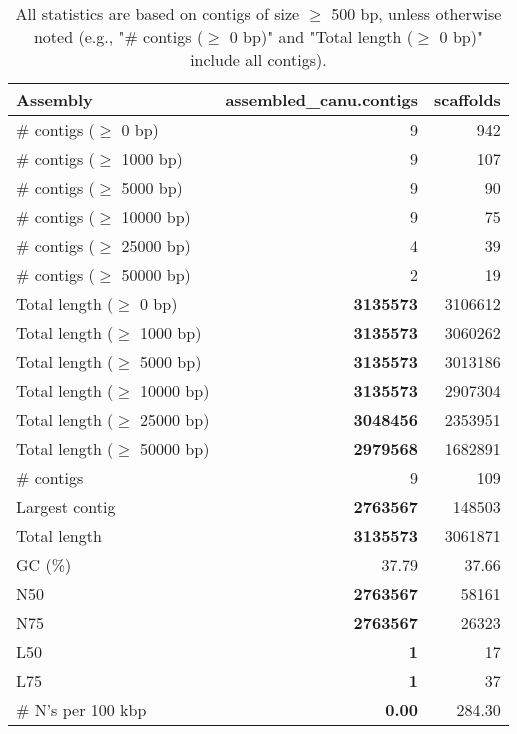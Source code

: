 \documentclass[12pt,a4paper]{article}
\begin{document}
\begin{table}[ht]
\begin{center}
\caption{All statistics are based on contigs of size $\geq$ 500 bp, unless otherwise noted (e.g., "\# contigs ($\geq$ 0 bp)" and "Total length ($\geq$ 0 bp)" include all contigs).}
\begin{tabular}{|l*{2}{|r}|}
\hline
Assembly & assembled\_canu.contigs & scaffolds \\ \hline
\# contigs ($\geq$ 0 bp) & 9 & 942 \\ \hline
\# contigs ($\geq$ 1000 bp) & 9 & 107 \\ \hline
\# contigs ($\geq$ 5000 bp) & 9 & 90 \\ \hline
\# contigs ($\geq$ 10000 bp) & 9 & 75 \\ \hline
\# contigs ($\geq$ 25000 bp) & 4 & 39 \\ \hline
\# contigs ($\geq$ 50000 bp) & 2 & 19 \\ \hline
Total length ($\geq$ 0 bp) & {\bf 3135573} & 3106612 \\ \hline
Total length ($\geq$ 1000 bp) & {\bf 3135573} & 3060262 \\ \hline
Total length ($\geq$ 5000 bp) & {\bf 3135573} & 3013186 \\ \hline
Total length ($\geq$ 10000 bp) & {\bf 3135573} & 2907304 \\ \hline
Total length ($\geq$ 25000 bp) & {\bf 3048456} & 2353951 \\ \hline
Total length ($\geq$ 50000 bp) & {\bf 2979568} & 1682891 \\ \hline
\# contigs & 9 & 109 \\ \hline
Largest contig & {\bf 2763567} & 148503 \\ \hline
Total length & {\bf 3135573} & 3061871 \\ \hline
GC (\%) & 37.79 & 37.66 \\ \hline
N50 & {\bf 2763567} & 58161 \\ \hline
N75 & {\bf 2763567} & 26323 \\ \hline
L50 & {\bf 1} & 17 \\ \hline
L75 & {\bf 1} & 37 \\ \hline
\# N's per 100 kbp & {\bf 0.00} & 284.30 \\ \hline
\end{tabular}
\end{center}
\end{table}
\end{document}
